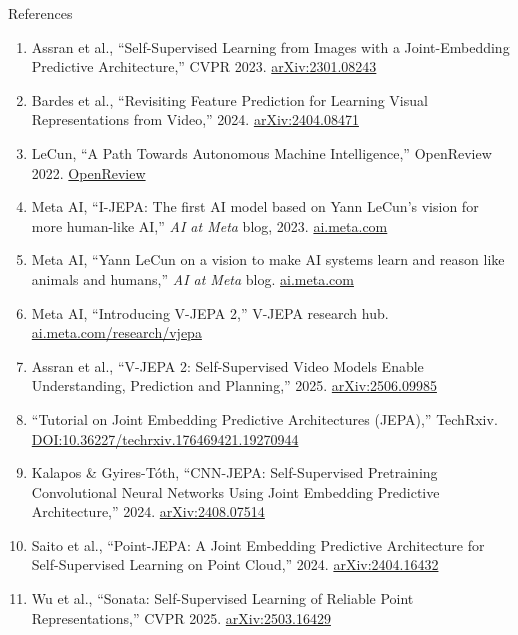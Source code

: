 \begin{frame}[allowframebreaks]{References}
  \footnotesize
  \begin{enumerate}\itemsep0.08em
    \item Assran et al., ``Self-Supervised Learning from Images with a Joint-Embedding Predictive Architecture,'' CVPR 2023. \href{https://arxiv.org/abs/2301.08243}{arXiv:2301.08243}
    \item Bardes et al., ``Revisiting Feature Prediction for Learning Visual Representations from Video,'' 2024. \href{https://arxiv.org/abs/2404.08471}{arXiv:2404.08471}
    \item LeCun, ``A Path Towards Autonomous Machine Intelligence,'' OpenReview 2022. \href{https://openreview.net/forum?id=BZ5a1r-kVsf}{OpenReview}
    \item Meta AI, ``I-JEPA: The first AI model based on Yann LeCun's vision for more human-like AI,'' \emph{AI at Meta} blog, 2023. \href{https://ai.meta.com/blog/yann-lecun-ai-model-i-jepa}{ai.meta.com}
    \item Meta AI, ``Yann LeCun on a vision to make AI systems learn and reason like animals and humans,'' \emph{AI at Meta} blog. \href{https://ai.meta.com/blog/yann-lecun-advances-in-ai-research/}{ai.meta.com}
    \item Meta AI, ``Introducing V-JEPA 2,'' V-JEPA research hub. \href{https://ai.meta.com/research/vjepa/}{ai.meta.com/research/vjepa}
    \item Assran et al., ``V-JEPA 2: Self-Supervised Video Models Enable Understanding, Prediction and Planning,'' 2025. \href{https://arxiv.org/abs/2506.09985}{arXiv:2506.09985}
    \item ``Tutorial on Joint Embedding Predictive Architectures (JEPA),'' TechRxiv. \href{https://www.techrxiv.org/doi/10.36227/techrxiv.176469421.19270944}{DOI:10.36227/techrxiv.176469421.19270944}
    \item Kalapos \& Gyires-Tóth, ``CNN-JEPA: Self-Supervised Pretraining Convolutional Neural Networks Using Joint Embedding Predictive Architecture,'' 2024. \href{https://arxiv.org/abs/2408.07514}{arXiv:2408.07514}
    \item Saito et al., ``Point-JEPA: A Joint Embedding Predictive Architecture for Self-Supervised Learning on Point Cloud,'' 2024. \href{https://arxiv.org/abs/2404.16432}{arXiv:2404.16432}
    \item Wu et al., ``Sonata: Self-Supervised Learning of Reliable Point Representations,'' CVPR 2025. \href{https://arxiv.org/abs/2503.16429}{arXiv:2503.16429}

\end{enumerate}
\end{frame}
